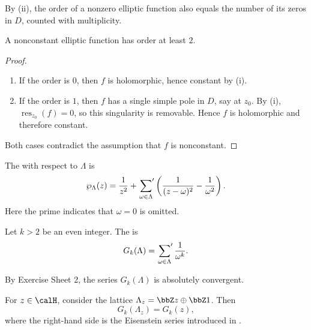\begin{remark}
    By (ii), the order of a nonzero elliptic function also equals the number of its zeros in $D$, counted with multiplicity.
\end{remark}

\begin{corollary}\label{Cor:MF_elliptic_order}
    A nonconstant elliptic function has order at least $2$.
\end{corollary}

\begin{proof}
    \leavevmode
    \begin{enumerate}[label=\textbf{Case~\arabic*}]
        \item If the order is $0$, then $f$ is holomorphic, hence constant by (i).
        \item If the order is $1$, then $f$ has a single simple pole in $D$, say at $z_0$. By (i), $\operatorname{res}_{z_0}(f) = 0$, so this singularity is removable. Hence $f$ is holomorphic and therefore constant.
    \end{enumerate}
    Both cases contradict the assumption that $f$ is nonconstant.
\end{proof}

\begin{definition}\label{Def:MF_Weierstrass}
    The  with respect to $\Lambda$ is
    \[
        \wp_\Lambda(z) = \frac{1}{z^2} + \sideset{}{'}\sum_{\omega \in \Lambda}\left(\frac{1}{(z - \omega)^2} - \frac{1}{\omega^2}\right).
    \]
    Here the prime indicates that $\omega = 0$ is omitted.
\end{definition}

\begin{definition}\label{Def:MF_lattice_Eisenstein}
    Let $k > 2$ be an even integer. The  is
    \[
        G_k(\Lambda) = \sideset{}{'}\sum_{\omega \in \Lambda}\frac{1}{\omega^k}.
    \]
\end{definition}

\begin{remarkstar}
    By Exercise Sheet 2, the series $G_k(\Lambda)$ is absolutely convergent.
\end{remarkstar}

\begin{remark}
    For $z \in \calH$, consider the lattice $\Lambda_z = \bbZ z \oplus \bbZ 1$. Then
    \[
        G_k(\Lambda_z) = G_k(z),
    \]
    where the right-hand side is the Eisenstein series introduced in .
\end{remark}

